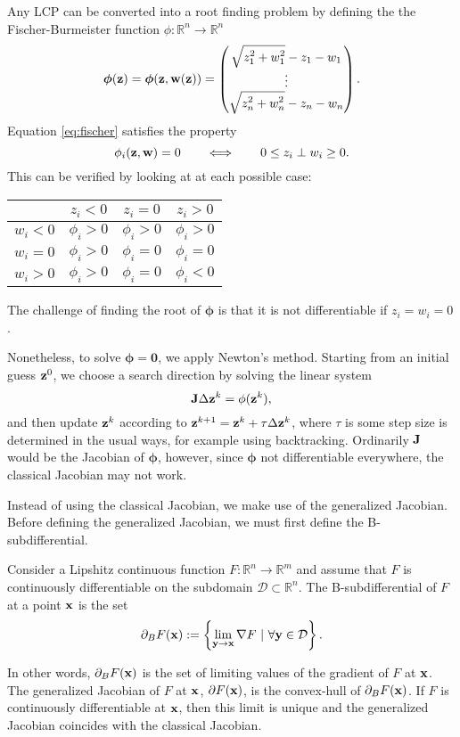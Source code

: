 Any LCP can be converted into a root finding problem by defining the the Fischer-Burmeister function $\phi:\mathbb{R}^n\to\mathbb{R}^n$ \cite{Fischer1992}
\begin{equation}\label{eq:fischer} \bm{\phi}({\mathbf{z}}) = \bm{\phi}({\mathbf{z}},{\mathbf{w}}({\mathbf{z}})) = \begin{pmatrix} \sqrt{\displaystyle z_1^2 + w_1^2} - z_1 - w_1\\ \vdots \\ \sqrt{\displaystyle z_n^2 + w_n^2} - z_n - w_n\end{pmatrix}.\end{equation}
Equation \eqref{eq:fischer} satisfies the property
\[ \phi_i({\mathbf{z}}, {\mathbf{w}}) = 0\qquad \Longleftrightarrow \qquad0\leq z_i \perp w_i \geq 0.\]
This can be verified by looking at at each possible case:
\begin{center}
\begin{tabular}{c |c | c | c}
	& $z_i < 0$ & $z_i =0$ &$ z_i > 0$\\
	\hline
	$w_i < 0$ & $\phi_i > 0$ & $\phi_i > 0$ & $\phi_i > 0$\\
	\hline
	$w_i = 0$ & $\phi_i>0$ & $\phi_i = 0$ & $\phi_i = 0$\\
	\hline
	$w_i > 0$ & $\phi_i > 0$ & $\phi_i = 0$ & $\phi_i < 0$   
\end{tabular}
\end{center}
The challenge of finding the root of $\bm{\phi}$ is that it is not differentiable if $z_i = w_i = 0$. 

Nonetheless, to solve $\bm{\phi} = \mathbf{0}$, we apply Newton's method. Starting from an initial guess ${\mathbf{z}}^0$, we choose a search direction by solving the linear system
\[ {\mathbf{J}}\Delta {\mathbf{z}}^k = \phi({\mathbf{z}}^k),\]
 and then update ${\mathbf{z}}^k$ according to ${\mathbf{z}}^{k+1} = {\mathbf{z}}^k + \tau\Delta{\mathbf{z}}^k$, where $\tau$ is some step size is determined in the usual ways, for example using backtracking. Ordinarily ${\mathbf{J}}$ would be the Jacobian of $\bm{\phi}$, however, since $\bm{\phi}$ not differentiable everywhere, the classical Jacobian may not work.

Instead of using the classical Jacobian, we make use of the generalized Jacobian. Before defining the generalized Jacobian, we must first define the B-subdifferential. 
\begin{definition}
	Consider a Lipshitz continuous function $F:\mathbb{R}^n\to\mathbb{R}^m$ and assume that $F$ is continuously differentiable on the subdomain $\mathcal{D}\subset\mathbb{R}^n$. The B-subdifferential of $F$ at a point ${\mathbf{x}}$ is the set
\[ \partial_B F({\mathbf{x}}) := \left\{\lim\limits_{{\mathbf{y}}\to{\mathbf{x}}} \nabla F ~| ~ \forall {\mathbf{y}}\in\mathcal{D}\right\}.\]
\end{definition}
In other words, $\partial_B F({\mathbf{x}})$ is the set of limiting values of the gradient of $F$ at ${\mathbf{x}}$. The generalized Jacobian of $F$ at ${\mathbf{x}}$, $\partial F({\mathbf{x}})$, is the convex-hull of $\partial_B F({\mathbf{x}})$.  If $F$ is continuously differentiable at ${\mathbf{x}}$, then this limit is unique and the generalized Jacobian coincides with the classical Jacobian. 

